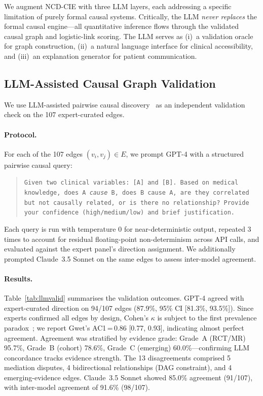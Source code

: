 \documentclass[runningheads]{llncs}
\begin{document}
We augment NCD-CIE with three LLM layers, each addressing a
specific limitation of purely formal causal systems.
Critically, the LLM \emph{never replaces} the formal causal
engine---all quantitative inference flows through the
validated causal graph and logistic-link scoring.
The LLM serves as (i)~a validation oracle for graph construction,
(ii)~a natural language interface for clinical accessibility, and
(iii)~an explanation generator for patient communication.

\subsection{LLM-Assisted Causal Graph Validation}\label{sec:llmvalidation}

We use LLM-assisted pairwise causal
discovery~\cite{kiciman2023causal} as an independent validation
check on the 107 expert-curated edges.

\paragraph{Protocol.}
For each of the 107 edges $(v_i, v_j) \in E$, we prompt GPT-4
with a structured pairwise causal query:
\begin{quote}
\small\texttt{Given two clinical variables: [A] and [B].
Based on medical knowledge, does A \emph{cause} B, does B cause A,
are they correlated but not causally related, or is there no
relationship? Provide your confidence (high/medium/low) and
brief justification.}
\end{quote}
Each query is run with temperature 0 for near-deterministic output,
repeated 3 times to account for residual floating-point
non-determinism across API calls, and evaluated against the expert
panel's direction assignment.
We additionally prompted Claude~3.5 Sonnet on the same edges to
assess inter-model agreement.

\paragraph{Results.}
Table~\ref{tab:llmvalid} summarises the validation outcomes.
GPT-4 agreed with expert-curated direction on 94/107 edges
(87.9\%, 95\% CI [81.3\%, 93.5\%]).
Since experts confirmed all edges by design, Cohen's $\kappa$ is
subject to the first prevalence paradox~\cite{feinstein1990kappa};
we report Gwet's AC1\,=\,0.86 [0.77, 0.93], indicating almost
perfect agreement.
Agreement was stratified by evidence grade:
Grade~A (RCT/MR) 95.7\%, Grade~B (cohort) 78.6\%, Grade~C
(emerging) 60.0\%---confirming LLM concordance tracks evidence
strength.
The 13 disagreements comprised 5 mediation disputes, 4 bidirectional
relationships (DAG constraint), and 4 emerging-evidence edges.
Claude~3.5 Sonnet showed 85.0\% agreement (91/107), with
inter-model agreement of 91.6\% (98/107).
\end{document}
